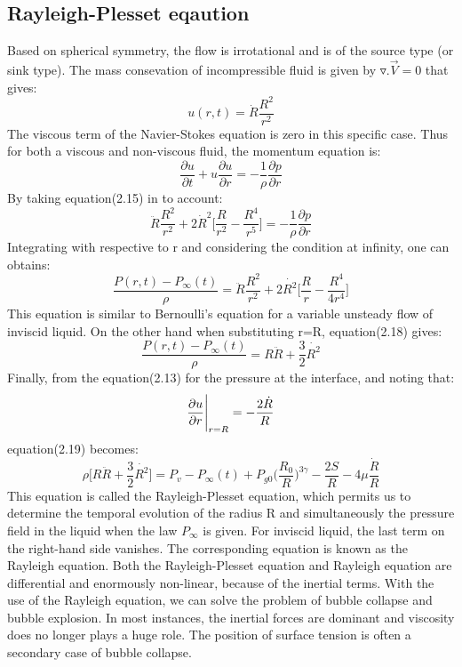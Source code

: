 \subsection{Rayleigh-Plesset eqaution}
Based on spherical symmetry, the flow is irrotational and is of the source type (or sink type). The mass consevation of incompressible fluid is given by $\triangledown.{\vec{V}}=0$ that gives:
\begin{equation}
u(r,t)=\dot{R}\frac{{R}^2}{{r}^2}
\end{equation}
The viscous term of the Navier-Stokes equation is zero in this specific case. Thus for both a viscous and non-viscous fluid, the momentum equation is:
\begin{equation}
{\frac{\partial u}{\partial t}}+u{\frac{\partial u}{\partial r}}=-{\frac{1}{\rho}}{\frac{\partial p}{\partial r}}
\end{equation}
By taking equation(2.15) in to account:
\begin{equation}
{\ddot{R}}{\frac{{R}^2}{r^2}}+2{{\dot{R}}^2}\Bigg[{\frac{R}{r^2}}-{\frac{R^4}{r^5}}\Bigg]=-{\frac{1}{\rho}}{\frac{\partial{p}}{\partial{r}}}
\end{equation}
Integrating with respective to r and considering the condition at infinity, one can obtains:
\begin{equation}
{\frac{P(r,t)-{P_{\infty}}(t)}{\rho}}={\ddot{R}}{\frac{{R}^2}{r^2}}+2{\dot{R^2}}{\Bigg[{\frac{R}{r}}-{\frac{R^4}{4r^4}}\Bigg]}
\end{equation}
This equation is similar to Bernoulli's equation for a variable unsteady flow of inviscid liquid. On the other hand when substituting r=R, equation(2.18) gives:
\begin{equation}
{\frac{P(r,t)-{P_{\infty}}(t)}{\rho}}=R{\ddot{R}}+{\frac{3}{2}}{\dot{R^2}}
\end{equation}
Finally, from the equation(2.13) for the pressure at the interface, and noting that:
\begin{equation}
{{\frac{\partial u}{\partial r}}\Bigg{\vert}_{r=R}}=-{\frac{2\dot R}{R}}
\end{equation}
equation(2.19) becomes:
\begin{equation}
 {\rho \Bigg[{R{\ddot{R}}+{\frac{3}{2}}{\dot{R^2}}}\Bigg]}={P_v}-{{P_{\infty}}(t)}+{P_{g0}}{\Bigg({\frac{R_0}{R}\Bigg)^{3\gamma}}}-{\frac{2S}{R}}-4\mu{\frac{\dot R}{R}}
\end{equation}
This equation is called the Rayleigh-Plesset equation, which permits us to determine the temporal evolution of the radius R and simultaneously the pressure field in the liquid when the law $P_{\infty}$
is given. For inviscid liquid, the last term on the right-hand side vanishes. The corresponding equation is known as the Rayleigh equation.
Both the Rayleigh-Plesset equation and Rayleigh equation are differential and enormously non-linear, because of the inertial terms. With the use of the Rayleigh equation, we can solve the problem of bubble collapse and bubble explosion.
In most instances, the inertial forces are dominant and viscosity does no longer plays a huge role. The position of surface tension is often a secondary case of bubble collapse.
